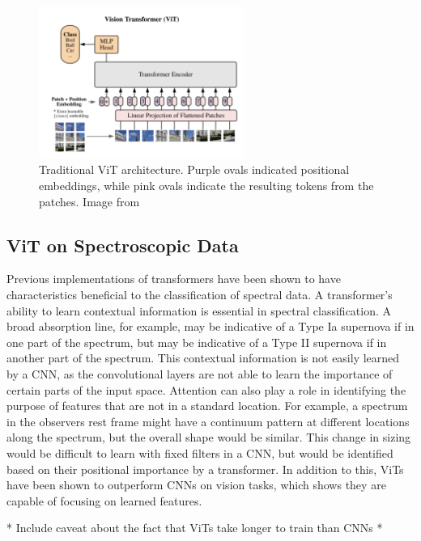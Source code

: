 \begin{figure}[t]
    \centering
    \includegraphics[width=0.6\textwidth]{figures/transformer_paper/ViT_Original.png}
    \caption[ViT Architecture]{Traditional ViT architecture. Purple ovals indicated 
        positional embeddings, while pink ovals indicate the resulting tokens from 
        the patches. Image from \textcite{dosovitskiy2020}
    \label{fig:ViT_orig}}
\end{figure}

\subsection{ViT on Spectroscopic Data}\label{sec:ViT}
Previous implementations of transformers have been shown to have characteristics 
beneficial to the classification of spectral data. A transformer's 
ability to learn contextual information is essential in spectral classification. 
A broad absorption line, for example, may be indicative of a Type Ia supernova 
if in one part of the spectrum, but may be indicative of a Type II supernova if
in another part of the spectrum. This contextual information is not easily learned 
by a CNN, as the convolutional layers are not able to learn the importance of
certain parts of the input space. Attention can also play a role in identifying 
the purpose of features that are not in a standard location. For example, a 
spectrum in the observers rest frame might have a continuum pattern at different locations 
along the spectrum, but the overall shape would be similar. This change in sizing 
would be difficult to learn with fixed filters in a CNN, but would be identified 
based on their positional importance by a transformer. In addition to this, ViTs 
have been shown to outperform CNNs on vision tasks, which shows they are capable 
of focusing on learned features. 


* Include caveat about the fact that ViTs take longer to train than CNNs *


